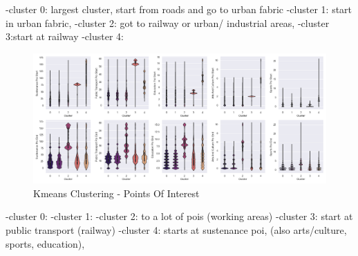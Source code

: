 -cluster 0: largest cluster, start from roads and go to urban fabric 
-cluster 1: start in urban fabric,
-cluster 2: got to railway or urban/ industrial areas, 
-cluster 3:start at railway
-cluster 4:

\begin{figure}[htp]
    \centering
    \includegraphics[width=1\textwidth]{Figures/Clustering/clusters_sustenance_poi_start.png}
    \caption{Kmeans Clustering - Points Of Interest}
    \label{fig:kmeans_poi}
\end{figure}

-cluster 0: 
-cluster 1: 
-cluster 2: to a lot of pois (working areas)
-cluster 3: start at public transport (railway)
-cluster 4: starts at sustenance poi, (also arts/culture, sports, education), 
